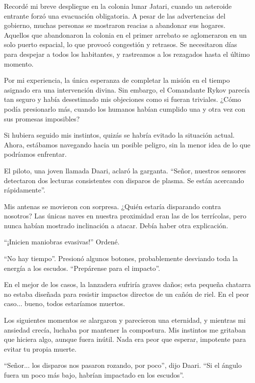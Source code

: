 \documentclass[spanish,12pt,a4paper,oneside,titlepage]{book}
\begin{document}
    Recordé mi breve despliegue en la colonia lunar Jatari, cuando un asteroide entrante forzó una evacuación obligatoria. A pesar de las advertencias del gobierno, muchas personas se mostraron reacias a abandonar sus hogares. Aquellos que abandonaron la colonia en el primer arrebato se aglomeraron en un solo puerto espacial, lo que provocó congestión y retrasos. Se necesitaron días para despejar a todos los habitantes, y rastreamos a los rezagados hasta el último momento.

    Por mi experiencia, la única esperanza de completar la misión en el tiempo asignado era una intervención divina. Sin embargo, el Comandante Rykov parecía tan seguro y había desestimado mis objeciones como si fueran triviales. ¿Cómo podía presionarlo más, cuando los humanos habían cumplido una y otra vez con sus promesas imposibles?

    Si hubiera seguido mis instintos, quizás se habría evitado la situación actual. Ahora, estábamos navegando hacia un posible peligro, sin la menor idea de lo que podríamos enfrentar.

    El piloto, una joven llamada Daari, aclaró la garganta. ``Señor, nuestros sensores detectaron dos lecturas consistentes con disparos de plasma. Se están acercando rápidamente''.

    Mis antenas se movieron con sorpresa. ¿Quién estaría disparando contra nosotros? Las únicas naves en nuestra proximidad eran las de los terrícolas, pero nunca habían mostrado inclinación a atacar. Debía haber otra explicación.

    ``¡Inicien maniobras evasivas!'' Ordené.

    ``No hay tiempo''. Presionó algunos botones, probablemente desviando toda la energía a los escudos. ``Prepárense para el impacto''.

    En el mejor de los casos, la lanzadera sufriría graves daños; esta pequeña chatarra no estaba diseñada para resistir impactos directos de un cañón de riel. En el peor caso... bueno, todos estaríamos muertos.

    Los siguientes momentos se alargaron y parecieron una eternidad, y mientras mi ansiedad crecía, luchaba por mantener la compostura. Mis instintos me gritaban que hiciera algo, aunque fuera inútil. Nada era peor que esperar, impotente para evitar tu propia muerte.

    ``Señor... los disparos nos pasaron rozando, por poco'', dijo Daari. ``Si el ángulo fuera un poco más bajo, habrían impactado en los escudos''.
\end{document}
